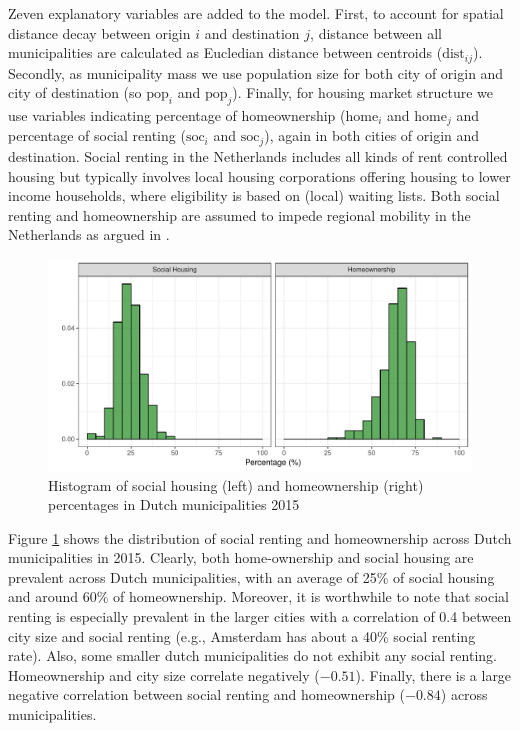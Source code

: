 \documentclass[fleqn,10pt]{SelfArx} %
\begin{document}
        Zeven explanatory variables are added to the model. First, to account for
        spatial distance decay between origin $i$ and destination $j$,
        distance between all municipalities are calculated as
        Eucledian distance between centroids
        ($\text{dist}_{ij}$). Secondly, as municipality mass we use
        population size for both city of origin and city of
        destination (so $\text{pop}_i$ and $\text{pop}_j$). Finally,
        for housing market structure we use variables indicating
        percentage of homeownership ($\text{home}_i$ and
        $\text{home}_j$ and percentage of social renting
        ($\text{soc}_i$ and $\text{soc}_j$), again in both cities of
        origin and destination. Social renting in the Netherlands
        includes all kinds of rent controlled housing but typically
        involves local housing corporations offering housing to lower
        income households, where eligibility is based on (local)
        waiting lists. Both social renting and homeownership are
        assumed to impede regional mobility in the Netherlands as argued in
        \citet{de2009homeownership}.

        \begin{figure}[ht]\centering %
          \includegraphics[width=0.8\linewidth]{../fig/hist_housing.pdf}
          \caption{Histogram of social housing (left) and
            homeownership (right) percentages in Dutch municipalities
            2015}
            \label{fig:housing_mig}
        \end{figure}

        Figure \ref{fig:housing_mig} shows the distribution of social
        renting and homeownership across Dutch municipalities in 2015.
        Clearly, both home-ownership and social housing are prevalent across Dutch municipalities, with an average of 25\% of social housing and
        around 60\% of homeownership. Moreover, it is worthwhile to
        note that social renting is especially prevalent in the
        larger cities with a correlation of 0.4 between city size and
        social renting (e.g., Amsterdam has about a 40\% social renting
        rate). Also, some smaller dutch municipalities do not exhibit
        any social renting. Homeownership and city size correlate
        negatively ($-0.51$). Finally, there is a large negative
        correlation between social renting and homeownership ($-0.84$) across municipalities.
        
\end{document}
